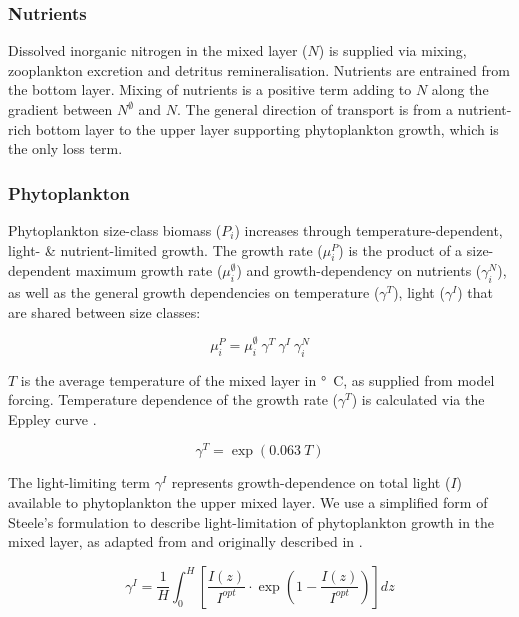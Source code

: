 \documentclass[journal abbreviations, manuscript]{copernicus}
\begin{document}
\subsubsection{Nutrients}
Dissolved inorganic nitrogen in the mixed layer ($N$) is supplied via mixing, zooplankton excretion and detritus remineralisation.
Nutrients are entrained from the bottom layer. Mixing of nutrients is a positive term adding to $N$ along the gradient between $N^\emptyset$ and $N$. The general direction of transport is from a nutrient-rich bottom layer to the upper layer supporting phytoplankton growth, which is the only loss term.


\subsubsection{Phytoplankton}
Phytoplankton size-class biomass ($P_i$) increases through temperature-dependent, light- \& nutrient-limited growth. The growth rate ($\mu_i^{P}$) is the product of a size-dependent maximum growth rate ($\mu_i^{\emptyset}$) and growth-dependency on nutrients ($\gamma_i^{N}$), as well as the general growth dependencies  on temperature ($\gamma^{T}$), light ($\gamma^{I}$) that are shared between size classes: 

\begin{equation}
    \mu_i^{P} = \mu_i^{\emptyset} \ \gamma^{T} \ \gamma^{I} \ \gamma_i^{N}
\end{equation}

$T$ is the average temperature of the mixed layer in \unit{\degree C}, as supplied from model forcing. Temperature dependence of the growth rate ($\gamma^{T}$) is calculated via the Eppley curve \citep{Eppley1972TemperatureSea}.

\begin{equation}
    \gamma^{T} = \exp{(0.063 \ T)} \label{mumax2}
\end{equation}

The light-limiting term $\gamma^{I}$ represents growth-dependence on total light ($I$) available to phytoplankton the upper mixed layer. We use a simplified form of Steele's formulation to describe light-limitation of phytoplankton growth in the mixed layer, as adapted from \citet{Acevedo-Trejos2016} and originally described in \citet{Steele1962EnvironmentalSea}.

\begin{equation}
    \gamma^{I} = \frac{1}{H} \int_{0}^{H}\left[ \frac{I(z)}{I^{opt}} \cdot \exp{\left( 1 - \frac{I(z)}{I^{opt}} \right) }  \right]dz \label{steele}
\end{equation}
\end{document}
